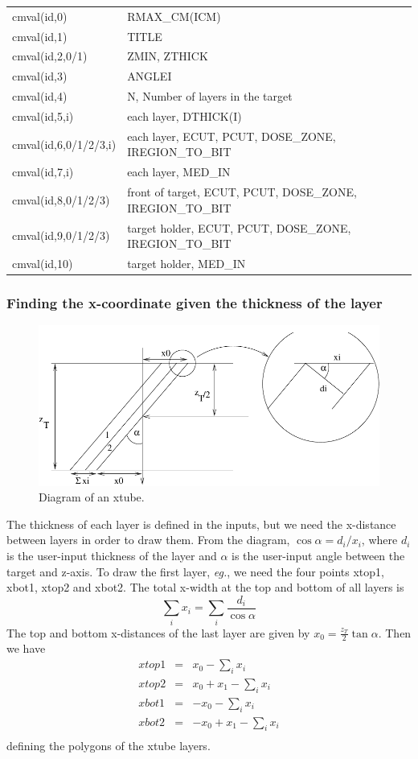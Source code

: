 \documentclass[12pt]{book}
\newcommand{\eg}{{\em eg.}}
\begin{document}
\begin{tabular}{|p{4.5cm}|p{11.5cm}|}\hline
cmval(id,0) &  RMAX\_CM(ICM) \\
cmval(id,1) &  TITLE \\
cmval(id,2,0/1) &  ZMIN, ZTHICK \\
cmval(id,3) &  ANGLEI \\
cmval(id,4) &  N, Number of layers in the target \\
cmval(id,5,i) &  each layer, DTHICK(I) \\
cmval(id,6,0/1/2/3,i) &  each layer, ECUT, PCUT, DOSE\_ZONE, IREGION\_TO\_BIT\\
cmval(id,7,i) &  each layer, MED\_IN \\
cmval(id,8,0/1/2/3) &  front of target, ECUT, PCUT, DOSE\_ZONE, IREGION\_TO\_BIT\\
cmval(id,9,0/1/2/3) &  target holder, ECUT, PCUT, DOSE\_ZONE, IREGION\_TO\_BIT\\
cmval(id,10) & target holder, MED\_IN \\\hline
\end{tabular}

\subsubsection{Finding the x-coordinate given the thickness of the layer}
\begin{figure}[htbp]
\vspace{1.6in}
\includegraphics{figures/xtubefig}
\caption{Diagram of an xtube.  \label{xtubefig}}
\end{figure}
The thickness of each layer is defined in the inputs, but we need the
x-distance between layers in order to draw them.  From the diagram,
$\cos\alpha=d_i/x_i$, where $d_i$ is the user-input thickness of the
layer and $\alpha$ is the user-input angle between the target and
z-axis.  To draw the first layer, \eg, we need the four points xtop1,
xbot1, xtop2 and xbot2.  The total x-width at the top and bottom of all
layers is
$$\sum_i x_i=\sum_i \frac{d_i}{\cos\alpha} $$
The top and bottom x-distances of the last layer are given by
$x_0=\frac{z_T}{2}\tan\alpha$.
Then we have
\begin{eqnarray}
 xtop1&=&x_0-\sum_i x_i\nonumber\\
 xtop2&=&x_0+x_1-\sum_i x_i \nonumber\\
 xbot1&=&-x_0-\sum_i x_i \nonumber\\
 xbot2&=&-x_0+x_1-\sum_i x_i \nonumber\\ \nonumber
\end{eqnarray}
\noindent defining the polygons of the xtube layers.
\end{document}
